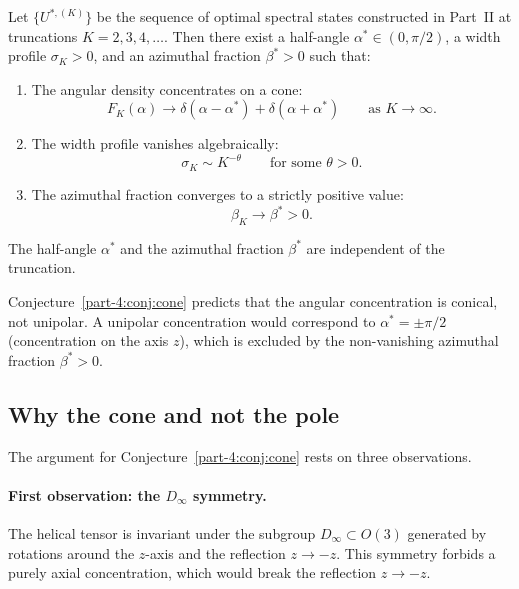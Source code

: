 \begin{conjecture}\label{part-4:conj:cone}
Let $\{U^{\ast,(K)}\}$ be the sequence of optimal spectral states 
constructed in Part~II at truncations $K=2,3,4,\ldots$. Then there 
exist a half-angle $\alpha^\ast\in(0,\pi/2)$, a width profile 
$\sigma_K>0$, and an azimuthal fraction $\beta^\ast>0$ such that:
\begin{enumerate}[label=(\roman*),leftmargin=*]
\item The angular density concentrates on a cone:
      \begin{equation}\label{part-4:eq:cone-concentration}
      F_K(\alpha) \to \delta(\alpha-\alpha^\ast) + 
      \delta(\alpha+\alpha^\ast)
      \qquad\text{as }K\to\infty.
      \end{equation}
\item The width profile vanishes algebraically:
      \begin{equation}\label{part-4:eq:width}
      \sigma_K \sim K^{-\theta}
      \qquad\text{for some }\theta>0.
      \end{equation}
\item The azimuthal fraction converges to a strictly positive value:
      \begin{equation}\label{part-4:eq:beta-star}
      \beta_K \to \beta^\ast > 0.
      \end{equation}
\end{enumerate}
The half-angle $\alpha^\ast$ and the azimuthal fraction $\beta^\ast$ 
are independent of the truncation.
\end{conjecture}

\begin{remark}\label{part-4:rem:not-unipolar}
Conjecture~\ref{part-4:conj:cone} predicts that the angular concentration 
is conical, not unipolar. A unipolar concentration would correspond 
to $\alpha^\ast = \pm\pi/2$ (concentration on the axis $z$), which 
is excluded by the non-vanishing azimuthal fraction $\beta^\ast>0$.
\end{remark}

\subsection{Why the cone and not the pole}
\label{part-4:ssec:why-cone}

The argument for Conjecture~\ref{part-4:conj:cone} rests on three 
observations.

\paragraph{First observation: the $D_\infty$ symmetry.}
The helical tensor is invariant under the subgroup 
$D_\infty\subset O(3)$ generated by rotations around the $z$-axis 
and the reflection $z\to -z$. This symmetry forbids a purely axial 
concentration, which would break the reflection $z\to -z$.

